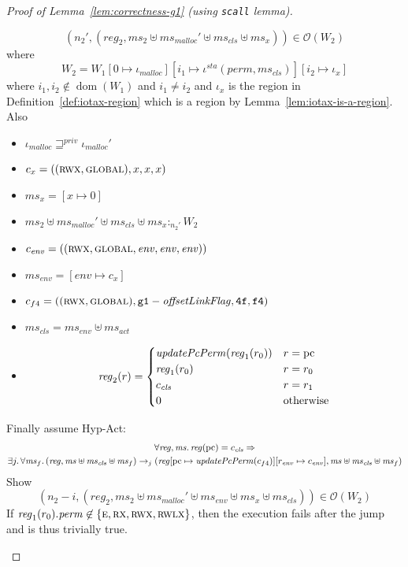 \documentclass[a4paper]{article}
\newcommand{\update}[2]{[#1 \mapsto #2]}
\DeclareMathOperator{\dom}{dom}
\newcommand{\var}[1]{\mathit{#1}}
\newcommand{\hs}{\var{ms}}
\newcommand{\ms}{\hs}
\newcommand{\pcreg}{\mathrm{pc}}
\newcommand{\reg}{\var{reg}}
\newcommand{\heap}{\var{mem}}
\newcommand{\perm}{\var{perm}}
\newcommand{\sta}{\var{sta}}
\newcommand{\olf}{\var{offsetLinkFlag}}
\newcommand{\env}{\var{env}}
\newcommand{\cls}{\var{cls}}
\newcommand{\act}{\var{act}}
\newcommand{\plainfun}[2]{
  \ifthenelse{\equal{#2}{}}
  {\mathit{#1}}
  {\mathit{#1}(#2)}
}
\newcommand{\updatePcPerm}[1]{\plainfun{updatePcPerm}{#1}}
\newcommand{\futurestr}{\mathbin{\sqsupseteq}^{\var{priv}}}
\newcommand{\heapSat}[3][\heap]{#1 :_{#2} #3}
\newcommand{\memSat}[3][n]{\heapSat[#2]{#1}{#3}}
\newcommand{\codelabel}[1]{\mathit{#1}}
\newcommand{\malloc}{\codelabel{malloc}}
\newcommand{\observations}{\mathcal{O}}
\newcommand{\npair}[2][n]{\left(#1,#2 \right)}
\newcommand{\plainperm}[1]{\textsc{#1}}
\newcommand{\exec}{\plainperm{rx}}
\newcommand{\entry}{\plainperm{e}}
\newcommand{\rwx}{\plainperm{rwx}}
\newcommand{\rwlx}{\plainperm{rwlx}}
\newcommand{\glob}{\plainperm{global}}
\newcommand{\step}[1][]{\rightarrow_{#1}}
\begin{document}
\begin{proof}[Proof of Lemma~\ref{lem:correctness-g1} (using \texttt{scall} lemma)]
\begin{enumproof}[resume]
\begin{enumproof}
          \[
            \npair[n_2']{(\reg_2,\ms_2 \uplus \ms_\malloc' \uplus \ms_\cls \uplus \ms_x)} \in \observations(W_2)
          \]
          where
          \[
            W_2 = W_1\update{0}{\iota_\malloc}\update{i_1}{\iota^\sta (\perm,\ms_\cls)}\update{i_2}{\iota_x}
          \]
          where $i_1,i_2\not\in\dom(W_1)$ and $i_1 \neq i_2$ and $\iota_x$ is the region in Definition~\ref{def:iotax-region} which is a region by Lemma~\ref{lem:iotax-is-a-region}. Also
          \begin{itemize}
          \item $\iota_\malloc \futurestr \iota_\malloc'$
          \item $c_x = ((\rwx,\glob),x,x,x)$
          \item $\ms_x = [x \mapsto 0]$
          \item $\memSat[n_2']{\ms_2 \uplus \ms_\malloc' \uplus \ms_\cls \uplus \ms_x}{W_2}$
          \item $c_\env = ((\rwx,\glob,\env,\env,\env))$
          \item $\ms_\env = [\env \mapsto c_x]$
          \item $c_{f4} = ((\rwx,\glob),\mathtt{g1} - \olf,\mathtt{4f},\mathtt{f4})$
          \item $\ms_\cls = \ms_\env \uplus \ms_\act$
          \item 
            \begin{equation*}
              \reg_2(r) =
              \begin{cases}
                \updatePcPerm{\reg_1(r_0)} & r = \pcreg \\
                \reg_1(r_0) & r = r_0 \\
                c_\cls & r = r_1 \\
                0 & \text{otherwise}
              \end{cases}
            \end{equation*}
          \end{itemize}
          Finally assume Hyp-Act:
            \begin{multline}
            \label{eq:g1-hyp-act}
            \forall \reg,\ms \ldotp \reg(\pcreg)=c_\cls \Rightarrow\\
            \exists j \ldotp \forall \ms_f \ldotp (\reg,\ms \uplus \ms_\cls \uplus \ms_f) \step[j] (\reg\update{\pcreg}{\updatePcPerm{c_{f4}}}\update{r_\env}{c_\env},\ms \uplus \ms_\cls \uplus \ms_f)
          \end{multline}
          Show
          \begin{equation}
            \label{eq:g1-obs-to-show}
            \npair[n_2-i]{(\reg_2,\ms_2 \uplus \ms_\malloc' \uplus \ms_\env \uplus \ms_x \uplus \ms_\cls)} \in \observations(W_2)
          \end{equation}
          If $\reg_1(r_0).\perm \not\in \{\entry, \exec, \rwx, \rwlx\}$, then the execution fails after the jump and \label{eq:g1-obs-to-show} is thus trivially true.


\end{enumproof}
\end{enumproof}
\end{proof}
\end{document}
